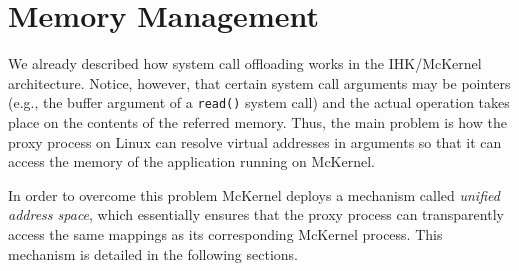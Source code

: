 \documentclass[twoside,11pt,fleqn]{book}
\begin{document}

\section{Memory Management}
\label{sec:unified_address_space}

We already described how system call offloading works in the IHK/McKernel
architecture.
Notice, however, that certain system call arguments may be pointers
(e.g., the buffer argument of a \texttt{read()} system call) and the actual
operation takes place on the contents of the referred memory.
Thus, the main problem is how the proxy process on Linux
can resolve virtual addresses in arguments so that it can access
the memory of the application running on McKernel.

In order to overcome this problem McKernel deploys a mechanism called
\textit{unified address space}, which essentially ensures that the proxy
process can transparently access the same mappings as its corresponding
McKernel process. This mechanism is detailed in the following sections.

\end{document}
